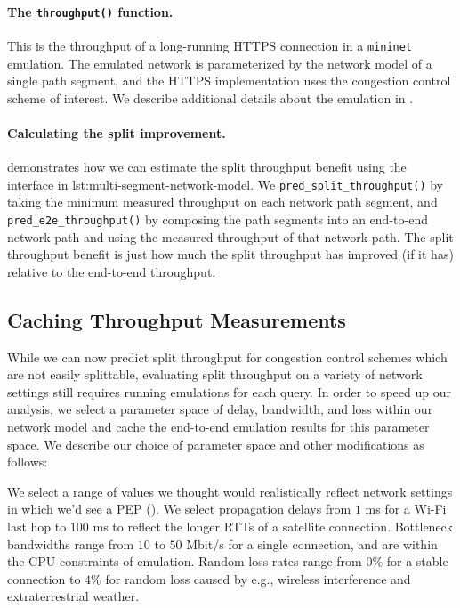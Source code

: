 \paragraph{The \texttt{throughput()} function.}
This is the throughput of a long-running HTTPS connection in a
\texttt{mininet} emulation. The emulated network is parameterized
by the network model of a single path segment, and the HTTPS implementation
uses the congestion control scheme of interest. We describe additional details
about the emulation in .

\paragraph{Calculating the split improvement.}

 demonstrates how we can estimate the split
throughput benefit using the interface in \Cref
{lst:multi-segment-network-model}. We \texttt{pred\_split\_throughput()} by taking
the minimum measured throughput on each network path segment, and \texttt
{pred\_e2e\_throughput()} by composing the path segments into an end-to-end
network path and using the measured throughput of that network path. The split
throughput benefit is just how much the split throughput has improved (if it has)
relative to the end-to-end throughput.

\subsection{Caching Throughput Measurements}
\label{sec:splitting:heuristic:caching}

While we can now predict split throughput for congestion control schemes which
are not easily
splittable, evaluating split throughput on a variety of network settings still
requires running emulations for each query. In order to speed up our analysis,
we select a parameter space of delay, bandwidth, and loss within our network
model and cache the end-to-end emulation results for this parameter space. We
describe our choice of parameter space and other modifications as follows:



We select a range of values we thought would realistically reflect network
settings in which we'd see a PEP (). We select propagation
delays from $1$ ms for a Wi-Fi last hop to $100$ ms to reflect the longer RTTs
of a satellite connection. Bottleneck bandwidths range from $10$ to $50$ Mbit/s
for a single connection, and are within the CPU constraints of emulation. Random
loss rates range from $0\%$ for a stable connection to $4\%$ for random loss
caused by e.g., wireless interference and extraterrestrial weather.

